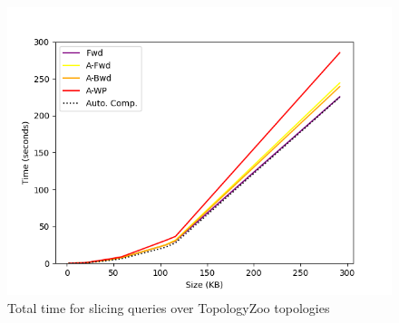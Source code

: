 \begin{figure}[ht]
\begin{center}

\includegraphics[scale=0.5]{figures/rq4.png}
\end{center}
\caption{Total time for slicing queries over TopologyZoo topologies}
\label{fig:graph-Q4}
\end{figure}


